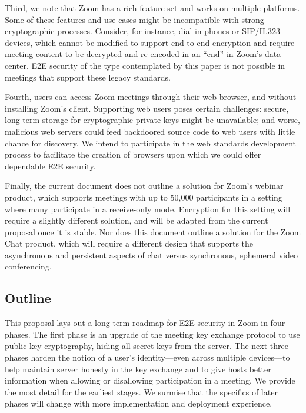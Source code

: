 Third, we note that Zoom has a rich feature set and works on multiple platforms. Some of these features and use cases might be incompatible with strong cryptographic processes. Consider, for instance, dial-in phones or SIP/H.323 devices, which cannot be modified to support end-to-end encryption and require meeting content to be decrypted and re-encoded in an ``end'' in Zoom's data center. E2E security of the type contemplated by this paper is not possible in meetings that support these legacy standards. 

Fourth, users can access Zoom meetings through their web browser, and without installing Zoom's client. Supporting web users poses certain challenges: secure, long-term storage for cryptographic private keys might be unavailable; and worse, malicious web servers could feed backdoored source code to web users with little chance for discovery. We intend to participate in the web standards development process to facilitate the creation of browsers upon which we could offer dependable E2E security. 

Finally, the current document does not outline a solution for Zoom's webinar product, which supports meetings with up to 50,000 participants in a setting where many participate in a receive-only mode. Encryption for this setting will require a slightly different solution, and will be adapted from the current proposal once it is stable. Nor does this document outline a solution for the Zoom Chat product, which will require a different design that supports the asynchronous and persistent aspects of chat versus synchronous, ephemeral video conferencing.

\subsection{Outline}
This proposal lays out a long-term roadmap for E2E security in Zoom in four phases. The first phase is an upgrade of the meeting key exchange protocol to use public-key cryptography, hiding all secret keys from the server. The next three phases harden the notion of a user's identity---even across multiple devices---to help maintain server honesty in the key exchange and to give hosts better information when allowing or disallowing participation in a meeting. We provide the most detail for the earliest stages. We surmise that the specifics of later phases will change with more implementation and deployment experience.
